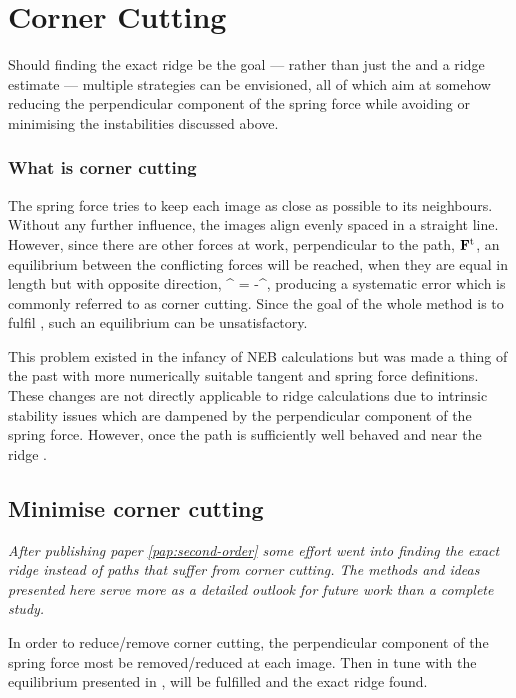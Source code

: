 \section{Corner Cutting}
\label{sec:erm-corner-cutting}

Should finding the exact ridge be the goal --- rather than just the  and a ridge estimate --- multiple strategies can be envisioned, all of which aim at somehow reducing the perpendicular component of the spring force while avoiding or minimising the instabilities discussed above.

\subsubsection{What is corner cutting}
The spring force tries to keep each image as close as possible to its neighbours.
Without any further influence, the images align evenly spaced in a straight line.
However, since there are other forces at work, perpendicular to the path, ${\mathrm{\mathbf{\bm{F}}}}^\text{t}$, an equilibrium between the conflicting forces will be reached, when they are equal in length but with opposite direction,
\vF^{\perp} = -\vF^,
\eeq
producing a systematic error which is commonly referred to as corner cutting.
Since the goal of the whole method is to fulfil , such an equilibrium can be unsatisfactory.

This problem existed in the infancy of NEB calculations but was made a thing of the past with more numerically suitable tangent and spring force definitions.~\cite{neb-tangent-2000}
These changes are not directly applicable to ridge calculations due to intrinsic stability issues which are dampened by the perpendicular component of the spring force.
However, once the path is sufficiently well behaved and near the ridge \expand.


\subsection{Minimise corner cutting}
\textit{After publishing paper \ref{pap:second-order} some effort went into finding the exact ridge instead of paths that suffer from corner cutting.
The methods and ideas presented here serve more as a detailed outlook for future work than a complete study.}

In order to reduce/remove corner cutting, the perpendicular component of the spring force most be removed/reduced at each image.
Then in tune with the equilibrium presented in ,  will be fulfilled and the exact ridge found.

